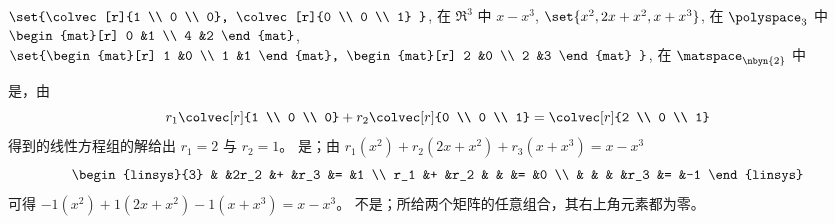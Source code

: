 \begin{exercises}
\begin{exparts}
        \( \set{\colvec[r]{1 \\ 0 \\ 0},
                \colvec[r]{0 \\ 0 \\ 1}  } \),
        在 \( \Re^3 \) 中
      \partsitem \( x-x^3 \),
        \( \set{x^2,2x+x^2,x+x^3} \),
        在 \( \polyspace_3 \) 中
      \partsitem \( \begin{mat}[r]
                 0  &1  \\
                 4  &2
               \end{mat}  \),
        \( \set{\begin{mat}[r]
                  1  &0  \\
                  1  &1
                \end{mat},
                \begin{mat}[r]
                  2  &0  \\
                  2  &3
                \end{mat}  } \),
        在 \( \matspace_{\nbyn{2}} \) 中
    \end{exparts}
    \begin{answer}
      \begin{exparts}
         \partsitem 是，由
          \begin{equation*}
            r_1\colvec[r]{1 \\ 0 \\ 0}+r_2\colvec[r]{0 \\ 0 \\ 1}
              =\colvec[r]{2 \\ 0 \\ 1}
          \end{equation*}
          得到的线性方程组的解给出 \( r_1=2 \) 与 \( r_2=1 \)。
        \partsitem 是；由
          \( r_1(x^2)+r_2(2x+x^2)+r_3(x+x^3)=x-x^3 \)
          \begin{equation*}
            \begin{linsys}{3}
                  &  &2r_2 &+ &r_3 &= &1  \\
              r_1 &+ &r_2  &  &    &= &0  \\
                  &  &     &  &r_3 &= &-1
            \end{linsys}
          \end{equation*}
          可得 \( -1(x^2)+1(2x+x^2)-1(x+x^3)=x-x^3 \)。
       \partsitem 不是；所给两个矩阵的任意组合，其右上角元素都为零。
      \end{exparts}

\end{answer}
\end{exercises}
